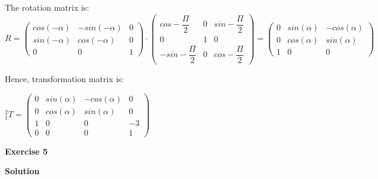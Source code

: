 \documentclass[12pt]{article}
\begin{document}
\begin{list}{)~}{}
The rotation matrix is:
$R=\left(\begin{array}{ccc}
cos\left(-\alpha\right) & -sin\left(-\alpha\right) & 0 \\
sin\left(-\alpha\right) & cos\left(-\alpha\right) & 0\\
0 & 0 & 1\end{array}\right)\cdot
\left(\begin{array}{ccc}
cos -\dfrac{\Pi}{2} & 0 & sin -\dfrac{\Pi}{2} \\
0 & 1 & 0\\
-sin -\dfrac{\Pi}{2} & 0 & cos -\dfrac{\Pi}{2} \end{array}\right) =\left(\begin{array}{ccc}
0 & sin\left(\alpha\right) & -cos\left(\alpha\right) \\
0 & cos\left(\alpha\right) & sin\left(\alpha\right)\\
1 & 0 & 0\end{array}\right)$

Hence, transformation matrix is:

$_{1}^{2}T = \left(\begin{array}{cccc}
0 & sin\left(\alpha\right)& -cos\left(\alpha\right) & 0\\
0 & cos\left(\alpha\right) & sin\left(\alpha\right) & 0\\
1 & 0 & 0 & -3 \\
0 & 0 & 0 & 1\end{array}\right)$

\end{list}

\newpage
\textbf{Exercise 5}		
		
\textbf{Solution}
\end{document}
